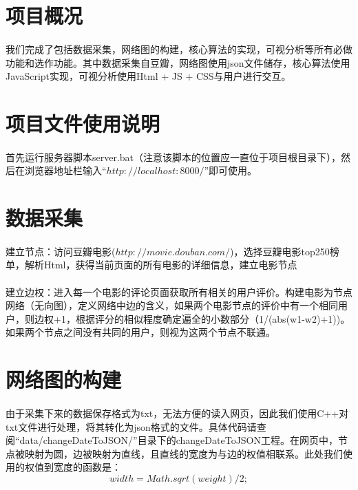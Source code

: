 \documentclass{article}
\begin{document}
\begin{CJK}{UTF8}{gkai}
\section{项目概况} %
	\paragraph{}
	我们完成了包括数据采集，网络图的构建，核心算法的实现，可视分析等所有必做功能和选作功能。其中数据采集自豆瓣，网络图使用json文件储存，核心算法使用JavaScript实现，可视分析使用Html + JS + CSS与用户进行交互。

\section{项目文件使用说明} %
	\paragraph{}
	首先运行服务器脚本server.bat（注意该脚本的位置应一直位于项目根目录下），然后在浏览器地址栏输入“$http://localhost:8000/$”即可使用。

\section{数据采集} %
	\paragraph{}
	建立节点：访问豆瓣电影($http://movie.douban.com/$)，选择豆瓣电影top250榜单，解析Html，获得当前页面的所有电影的详细信息，建立电影节点
	\paragraph{}
	建立边权：进入每一个电影的评论页面获取所有相关的用户评价。构建电影为节点网络（无向图），定义网络中边的含义，如果两个电影节点的评价中有一个相同用户，则边权+1，根据评分的相似程度确定遍全的小数部分（1/(abs(w1-w2)+1))。如果两个节点之间没有共同的用户，则视为这两个节点不联通。


\section{网络图的构建} %
	\paragraph{}
	由于采集下来的数据保存格式为txt，无法方便的读入网页，因此我们使用C++对txt文件进行处理，将其转化为json格式的文件。具体代码请查阅“data/changeDateToJSON/”目录下的changeDateToJSON工程。在网页中，节点被映射为圆，边被映射为直线，且直线的宽度为与边的权值相联系。此处我们使用的权值到宽度的函数是：
		$$width = Math.sqrt(weight)/2;$$


\end{CJK}
\end{document}

